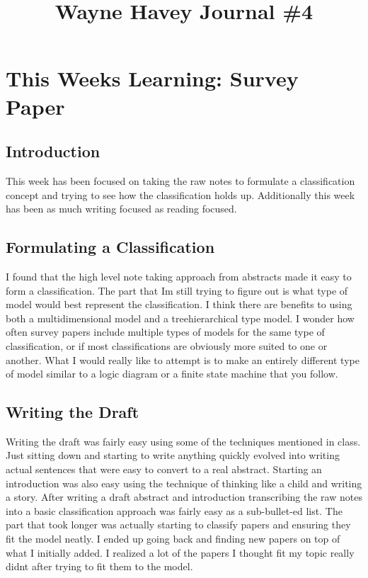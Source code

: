 \documentclass[conference]{IEEEtran}
\begin{document}
\title{Wayne Havey Journal \#4\\
}

\author{
}

\maketitle

\section{This Weeks Learning: Survey Paper}
\subsection{Introduction}
This week has been focused on taking the raw notes to formulate a classification concept and trying to see how the classification holds up. Additionally this week has been as much writing focused as reading focused.
\subsection{Formulating a Classification}
I found that the high level note taking approach from abstracts made it easy to form a classification. The part that Im still trying to figure out is what type of model would best represent the classification. I think there are benefits to using both a multidimensional model and a tree\/hierarchical type model. I wonder how often survey papers include multiple types of models for the same type of classification, or if most classifications are obviously more suited to one or another. What I would really like to attempt is to make an entirely different type of model similar to a logic diagram or a finite state machine that you follow. 
\subsection{Writing the Draft}
Writing the draft was fairly easy using some of the techniques mentioned in class. Just sitting down and starting to write anything quickly evolved into writing actual sentences that were easy to convert to a real abstract. Starting an introduction was also easy using the technique of thinking like a child and writing a story. After writing a draft abstract and introduction transcribing the raw notes into a basic classification approach was fairly easy as a sub-bullet-ed list. The part that took longer was actually starting to classify papers and ensuring they fit the model neatly. I ended up going back and finding new papers on top of what I initially added. I realized a lot of the papers I thought fit my topic really didnt after trying to fit them to the model.
\end{document}
